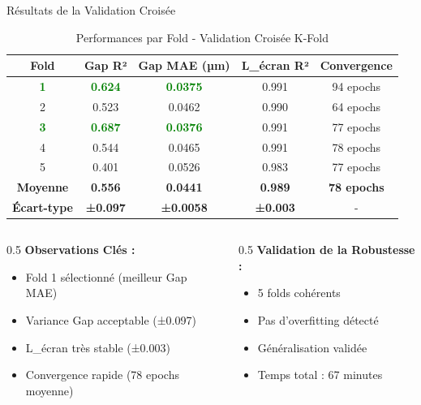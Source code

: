 \documentclass[aspectratio=169]{beamer}
\begin{document}
\begin{frame}{Résultats de la Validation Croisée}
    \begin{table}[h]
        \centering
        \caption{Performances par Fold - Validation Croisée K-Fold}
        \begin{tabular}{@{}ccccc@{}}
            \toprule
            \textbf{Fold} & \textbf{Gap R²} & \textbf{Gap MAE (µm)} & \textbf{L\_écran R²} & \textbf{Convergence} \\
            \midrule
            \textcolor{green}{\textbf{1}} & \textcolor{green}{\textbf{0.624}} & \textcolor{green}{\textbf{0.0375}} & 0.991 & 94 epochs \\
            2 & 0.523 & 0.0462 & 0.990 & 64 epochs \\
            \textcolor{green}{\textbf{3}} & \textcolor{green}{\textbf{0.687}} & \textcolor{green}{\textbf{0.0376}} & 0.991 & 77 epochs \\
            4 & 0.544 & 0.0465 & 0.991 & 78 epochs \\
            5 & 0.401 & 0.0526 & 0.983 & 77 epochs \\
            \midrule
            \textbf{Moyenne} & \textbf{0.556} & \textbf{0.0441} & \textbf{0.989} & \textbf{78 epochs} \\
            \textbf{Écart-type} & \textbf{±0.097} & \textbf{±0.0058} & \textbf{±0.003} & - \\
            \bottomrule
        \end{tabular}
    \end{table}
    
    \vspace{0.3cm}
    \begin{columns}
        \begin{column}{0.5\textwidth}
            \textbf{Observations Clés :}
            \begin{itemize}
                \item Fold 1 sélectionné (meilleur Gap MAE)
                \item Variance Gap acceptable (±0.097)
                \item L\_écran très stable (±0.003)
                \item Convergence rapide (78 epochs moyenne)
            \end{itemize}
        \end{column}
        \begin{column}{0.5\textwidth}
            \textbf{Validation de la Robustesse :}
            \begin{itemize}
                \item 5 folds cohérents
                \item Pas d'overfitting détecté
                \item Généralisation validée
                \item Temps total : 67 minutes
            \end{itemize}
        \end{column}
    \end{columns}
\end{frame}
\end{document}
